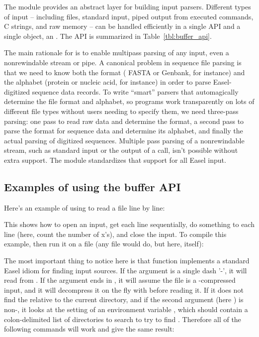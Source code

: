 The  module provides an abstract layer for building
input parsers. Different types of input -- including files, standard
input, piped output from executed commands, C strings, and raw memory
-- can be handled efficiently in a single API and a single object, an
. The API is summarized in
Table~\ref{tbl:buffer_api}.

The main rationale for  is to enable multipass parsing
of any input, even a nonrewindable stream or pipe. A canonical problem
in sequence file parsing is that we need to know both the format (
FASTA or Genbank, for instance) and the alphabet (protein or nucleic
acid, for instance) in order to parse Easel-digitized sequence data
records. To write ``smart'' parsers that automagically determine the
file format and alphabet, so programs work transparently on lots of
different file types without users needing to specify them, we need
three-pass parsing: one pass to read raw data and determine the
format, a second pass to parse the format for sequence data and
determine its alphabet, and finally the actual parsing of digitized
sequences. Multiple pass parsing of a nonrewindable stream, such as
standard input or the output of a  call, isn't possible
without extra support. The  module standardizes that
support for all Easel input.

\subsection{Examples of using the buffer API}

Here's an example of using  to read a file line by
line:



This shows how to open an input, get each line sequentially, do
something to each line (here, count the number of x's), and close the
input.  To compile this example, then run it on a file (any file would
do, but here,  itself):


The most important thing to notice here is that
 function implements a standard Easel idiom
for finding input sources. If the  argument is a
single dash '-', it will read from . If the
 argument ends in , it will assume the file
is a -compressed input, and it will decompress it on the
fly with  before reading it. If it does not find the
 relative to the current directory, and if the second
argument (here ) is non-, it looks at the
setting of an environment variable , which should
contain a colon-delimited list of directories to search to try to find
. Therefore all of the following commands will work
and give the same result:

